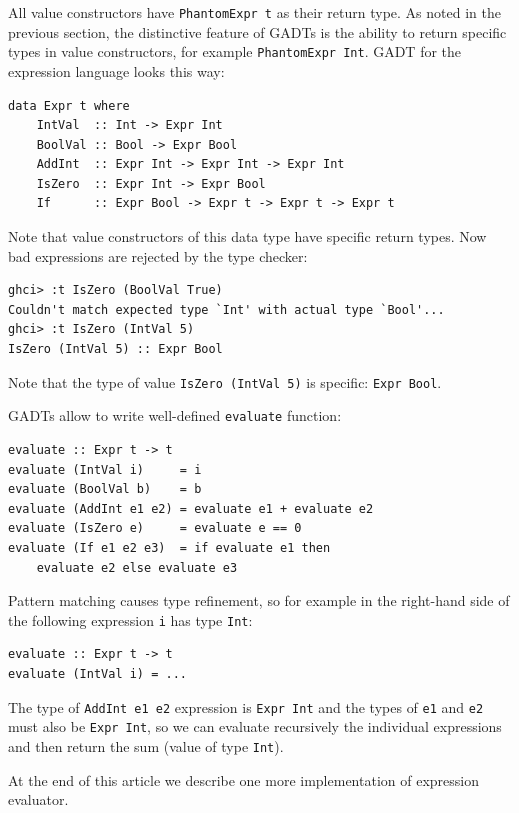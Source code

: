 \documentclass{tmr}
\begin{document}
All value constructors have \verb|PhantomExpr t| as their return type. As noted in the previous section, the distinctive feature of GADTs is the ability to return specific types in value constructors, for example \verb|PhantomExpr Int|. GADT for the expression language looks this way:

\begin{Verbatim}
data Expr t where
    IntVal  :: Int -> Expr Int
    BoolVal :: Bool -> Expr Bool
    AddInt  :: Expr Int -> Expr Int -> Expr Int
    IsZero  :: Expr Int -> Expr Bool
    If      :: Expr Bool -> Expr t -> Expr t -> Expr t
\end{Verbatim}

Note that value constructors of this data type have specific return types. Now bad expressions are rejected by the type checker:

\begin{Verbatim}
ghci> :t IsZero (BoolVal True)
Couldn't match expected type `Int' with actual type `Bool'...
ghci> :t IsZero (IntVal 5)
IsZero (IntVal 5) :: Expr Bool
\end{Verbatim}

Note that the type of value \verb|IsZero (IntVal 5)| is specific: \verb|Expr Bool|.

GADTs allow to write well-defined \verb|evaluate| function:

\begin{Verbatim}
evaluate :: Expr t -> t
evaluate (IntVal i)     = i
evaluate (BoolVal b)    = b
evaluate (AddInt e1 e2) = evaluate e1 + evaluate e2
evaluate (IsZero e)     = evaluate e == 0
evaluate (If e1 e2 e3)  = if evaluate e1 then
    evaluate e2 else evaluate e3
\end{Verbatim}

Pattern matching causes type refinement, so for example in the right-hand side of the following expression \verb|i| has type \verb|Int|:

\begin{Verbatim}
evaluate :: Expr t -> t
evaluate (IntVal i) = ...
\end{Verbatim}

The type of \verb|AddInt e1 e2| expression is \verb|Expr Int| and the types of \verb|e1| and \verb|e2| must also be \verb|Expr Int|, so we can evaluate recursively the individual expressions and then return the sum (value of type \verb|Int|).

At the end of this article we describe one more implementation of expression evaluator.
\end{document}
